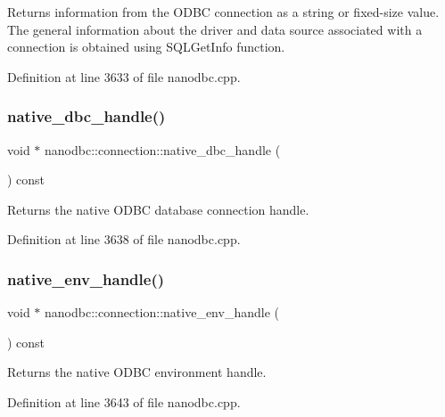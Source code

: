 Returns information from the O\+D\+BC connection as a string or fixed-\/size value. The general information about the driver and data source associated with a connection is obtained using {\ttfamily S\+Q\+L\+Get\+Info} function. 



Definition at line 3633 of file nanodbc.\+cpp.

\mbox{\label{classnanodbc_1_1connection_a4de11a5f93a7bc42092d7be97addea33}} 
\subsubsection{\texorpdfstring{native\_dbc\_handle()}{native\_dbc\_handle()}}
{\footnotesize\ttfamily void $\ast$ nanodbc\+::connection\+::native\+\_\+dbc\+\_\+handle (\begin{DoxyParamCaption}{ }\end{DoxyParamCaption}) const}



Returns the native O\+D\+BC database connection handle. 



Definition at line 3638 of file nanodbc.\+cpp.

\mbox{\label{classnanodbc_1_1connection_ac083c91d1f8ae0fad4128c0ce99ae71b}} 
\subsubsection{\texorpdfstring{native\_env\_handle()}{native\_env\_handle()}}
{\footnotesize\ttfamily void $\ast$ nanodbc\+::connection\+::native\+\_\+env\+\_\+handle (\begin{DoxyParamCaption}{ }\end{DoxyParamCaption}) const}



Returns the native O\+D\+BC environment handle. 



Definition at line 3643 of file nanodbc.\+cpp.

